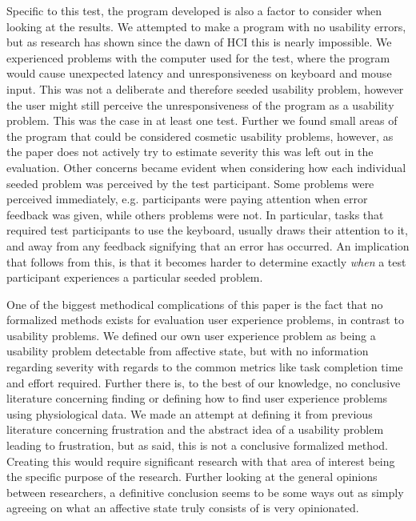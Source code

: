 Specific to this test, the program developed is also a factor to consider when looking at the results.  We attempted to
make a program with no usability errors, but as research has shown since the dawn of HCI this is nearly impossible.  We
experienced problems with the computer used for the test, where the program would cause unexpected latency and unresponsiveness on keyboard
and mouse input. This was not a deliberate and therefore seeded usability problem, however the user might still perceive the
unresponsiveness of the program as a usability problem. This was the case in at least one test.  Further we found small
areas of the program that could be considered cosmetic usability problems, however, as the paper does not actively try
to estimate severity this was left out in the evaluation. Other concerns became evident when considering how each
individual seeded problem was perceived by the test participant. Some problems were perceived immediately,
e.g. participants were paying attention when error feedback was given, while others problems were not. In particular,
tasks that required test participants to use the keyboard, usually draws their attention to it, and away from any
feedback signifying that an error has occurred. An implication that follows from this, is that it becomes harder to
determine exactly \textit{when} a test participant experiences a particular seeded problem.

One of the biggest methodical complications of this paper is the fact that no formalized methods exists for evaluation
user experience problems, in contrast to usability problems. We defined our own user experience problem as being a
usability problem detectable from affective state, but with no information regarding severity with regards to the common
metrics like task completion time and effort required. Further there is, to the best of our knowledge, no conclusive
literature concerning finding or defining how to find user experience problems using physiological data. We made an
attempt at defining it from previous literature concerning frustration and the abstract idea of a usability problem
leading to frustration, but as said, this is not a conclusive formalized method. Creating this would require significant
research with that area of interest being the specific purpose of the research. Further looking at the general opinions
between researchers, a definitive conclusion seems to be some ways out as simply agreeing on what an affective state
truly consists of is very opinionated.

